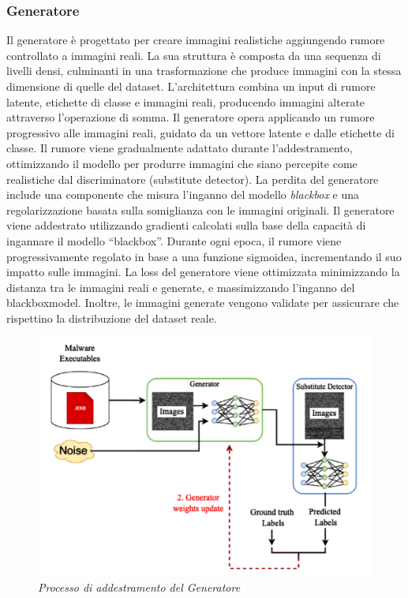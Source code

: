 \subsubsection{Generatore}
Il generatore è progettato per creare immagini realistiche aggiungendo rumore controllato a immagini reali. La sua struttura è composta da una sequenza di livelli densi, culminanti in una trasformazione che produce immagini con la stessa dimensione di quelle del dataset. L'architettura combina un input di rumore latente, etichette di classe e immagini reali, producendo immagini alterate attraverso l'operazione di somma.
Il generatore opera applicando un rumore progressivo alle immagini reali, guidato da un vettore latente e dalle etichette di classe. Il rumore viene gradualmente adattato durante l'addestramento, ottimizzando il modello per produrre immagini che siano percepite come realistiche dal discriminatore (substitute detector). La perdita del generatore include una componente che misura l'inganno del modello \emph{blackbox} e una regolarizzazione basata sulla somiglianza con le immagini originali.
Il generatore viene addestrato utilizzando gradienti calcolati sulla base della capacità di ingannare il modello ``blackbox''. Durante ogni epoca, il rumore viene progressivamente regolato in base a una funzione sigmoidea, incrementando il suo impatto sulle immagini. La loss del generatore viene ottimizzata minimizzando la distanza tra le immagini reali e generate, e massimizzando l'inganno del \gls{blackboxmodel}. Inoltre, le immagini generate vengono validate per assicurare che rispettino la distribuzione del dataset reale.

\begin{figure}[ht]
    \centering
        \centering
        \includegraphics[width=0.6\linewidth]{images/generator_training.png}
        \caption{\emph{Processo di addestramento del Generatore}}
        \label{fig:generator_train}
\end{figure}

